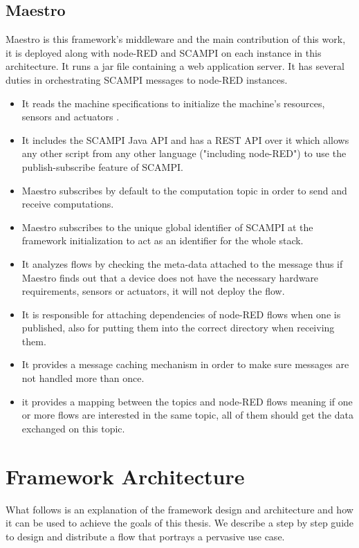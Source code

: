 \subsection{Maestro}
Maestro  is this framework's middleware and the main contribution of this work, it is deployed along with node-RED and SCAMPI on each instance in this architecture. It runs a jar file containing a web application server. It has several duties in orchestrating  SCAMPI messages to node-RED instances.
\begin{itemize}
\item It reads the machine specifications to initialize the machine's resources, sensors and actuators 	.
\item It includes the SCAMPI Java API and has a REST API over it which allows any other script from any other language ("including node-RED") to use the publish-subscribe feature of SCAMPI.
\item Maestro subscribes by default to the computation topic in order to  send and receive computations.
\item Maestro subscribes to the unique global identifier of SCAMPI at the framework initialization to act as an identifier for the whole stack.

\item It analyzes  flows by checking the meta-data  attached to the message thus if Maestro finds out that a device does not have the necessary hardware requirements, sensors or actuators, it will not deploy the flow. 
\item It is responsible for attaching dependencies of  node-RED flows when one is published, also for putting them into the correct directory when receiving them.
\item It provides a message caching mechanism in order to make sure messages are not handled more than once.
\item it provides a mapping between the topics and node-RED flows meaning if one or more flows are interested in the same topic, all of them should get the data exchanged on this topic.
 \end{itemize}

\section{Framework Architecture} \label{sec:arhcitecture}
What follows is an explanation of the framework design and architecture and how it can be used to achieve the goals of this thesis. We describe a step by step guide to design and distribute a flow that portrays a pervasive use case.


